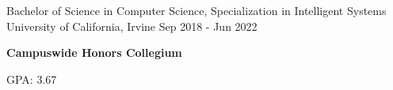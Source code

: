 
\begin{cventries}
  \cventry
    {Bachelor of Science in Computer Science, Specialization in Intelligent Systems} %
    {University of California, Irvine} %
    {} %
    {Sep 2018 - Jun 2022} %
    {
      \begin {cvitems}
        \item{\textbf{Campuswide Honors Collegium}}
        \item {GPA: 3.67}
      \end{cvitems}
    }
\end{cventries}
